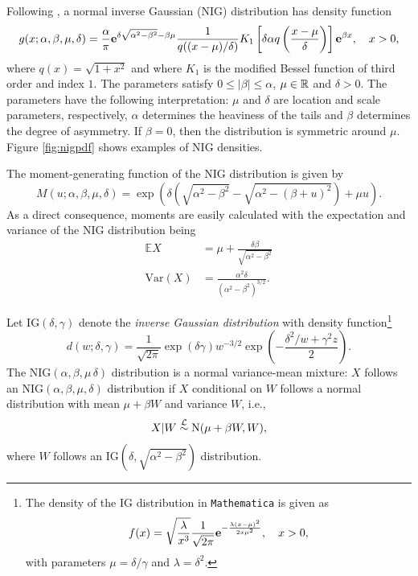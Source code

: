 Following \citep{BarndorffNielsen1997}, a normal inverse Gaussian
(NIG) distribution has density function
\begin{equation*}
  g(x; \alpha,\beta, \mu, \delta) = \frac{\alpha}{\pi} {\bf e}^{\delta
    \sqrt{\alpha^2-\beta^2} -\beta\mu} \frac{1}{q((x-\mu)/\delta)}
  K_1\left[\delta \alpha q\left(\frac{x-\mu}{\delta}\right) \right]
  {\bf e}^{\beta x},\quad x>0,
\end{equation*}
where $q(x) = \sqrt{1+x^2}$ and where $K_1$ is the modified Bessel
function of third order and index $1$. The parameters satisfy $0\leq
|\beta|\leq \alpha$, $\mu\in {\mathbb{R}}$ and $\delta>0$. The parameters have
the following interpretation: $\mu$ and $\delta$ are location and
scale parameters, respectively, $\alpha$ determines the heaviness of
the tails and $\beta$ determines the degree of asymmetry. If
$\beta=0$, then the distribution is symmetric around $\mu$. Figure
\ref{fig:nigpdf} shows examples of NIG densities. 

The moment-generating function of the NIG distribution is given by
\begin{equation*}
  M(u; \alpha, \beta, \mu, \delta) = \exp\left( \delta
    \left(\sqrt{\alpha^2-\beta^2} - \sqrt{\alpha^2 - (\beta +
        u)^2}\right) + \mu u\right). 
\end{equation*}
As a direct consequence, moments are easily calculated with the
expectation and variance of the NIG distribution being
\begin{align}
  \label{eq:4}
  \mathbb E X &= \mu + 
                \frac{\delta \beta}{\sqrt{\alpha^2-\beta^2}}\\
  \label{eq:5}
  \text{Var}(X) &= \frac{\alpha^2\delta}{(\alpha^2-\beta^2)^{3/2}}.
\end{align}


Let $\text{IG}(\delta,\gamma)$ denote the {\em inverse Gaussian
  distribution} with density function\footnote{%
  The density of the IG distribution in {\tt Mathematica} is given as
  \begin{equation*}
    f(x) = \sqrt{\frac{\lambda}{x^3}} \frac{1}{\sqrt{2\pi}}
    {\bf e}^{-\frac{\lambda(x-\mu)^2}{2 x\mu^2}},\quad x>0,
  \end{equation*}
  with parameters $\mu=\delta/\gamma$ and $\lambda=\delta^2$. 
  }%
\begin{equation}
  \label{eq:2}
  d(w; \delta, \gamma) = \frac{1}{\sqrt{2\pi}} \exp(\delta \gamma)
  w^{-3/2} \exp(-\frac{\delta^2/w + \gamma^2 z}{2}). 
\end{equation}
The $\text{NIG}(\alpha, \beta, \mu\, \delta)$ distribution is a normal
variance-mean mixture: $X$ follows an
$\text{NIG}(\alpha,\beta,\mu,\delta)$ distribution if $X$ conditional
on $W$ follows a normal distribution with mean $\mu+\beta W$ and
variance $W$, i.e., 
\begin{equation*}
  X|W\stackrel{\mathcal L}\sim {\rm N}(\mu + \beta W, W),
\end{equation*}
where $W$ follows an $\text{IG}(\delta, \sqrt{\alpha^2-\beta^2})$
distribution. 


